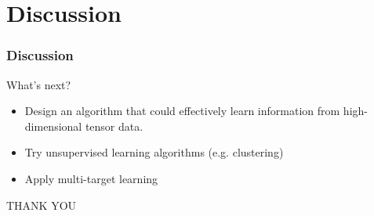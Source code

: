 \documentclass{beamer}
\begin{document}
\section{Discussion}
\begin{frame}
\frametitle{Discussion}
\large{What's next?}

\begin{itemize}
	\item  Design an algorithm that could effectively learn information from high-dimensional tensor data.
	\item  Try unsupervised learning algorithms (e.g. clustering)
	\item  Apply multi-target learning
\end{itemize} 
\end{frame}

\begin{frame}
\Huge{\centerline{THANK YOU}}
\end{frame}


   

\end{document}
